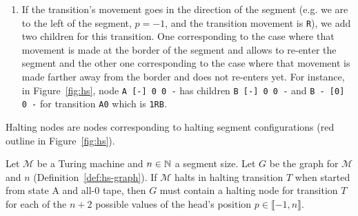 \begin{definition}[\HS graph]
\begin{itemize}
\begin{enumerate}
            \item If the transition's movement goes in the direction of the segment (e.g. we are to the left of the segment, $p=-1$, and the transition movement is \texttt{R}), we add two children for this transition. One corresponding to the case where that movement is made at the border of the segment and allows to re-enter the segment and the other one corresponding to the case where that movement is made farther away from the border and does not re-enters yet. For instance, in Figure~\ref{fig:hs}, node \texttt{A [-] 0 0 -} has children \texttt{B [-] 0 0 -} and \texttt{B - [0] 0 -} for transition \texttt{A0} which is \texttt{1RB}.
          \end{enumerate}
  \end{itemize}

  Halting nodes are nodes corresponding to halting segment configurations (red outline in Figure~\ref{fig:hs}).

\end{definition}

\begin{theorem}[\HS]\label{th:hs}\normalfont
  Let $\mathcal{M}$ be a Turing machine and $n \in \mathbb{N}$ a segment size. Let $G$ be the \HS graph for $\mathcal{M}$ and $n$ (Definition~\ref{def:hs-graph}). If $\mathcal{M}$ halts in halting transition $T$ when started from state A and all-0 tape, then $G$ must contain a halting node for transition $T$ for each of the $n+2$ possible values of the head's position $p \in \llbracket -1, n \rrbracket$.
\end{theorem}